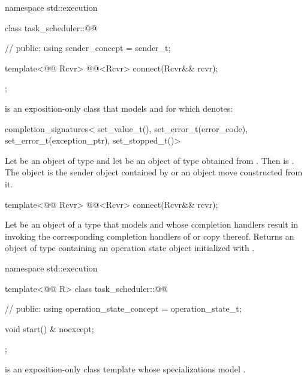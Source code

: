 \pnum
\begin{codeblock}
namespace std::execution {
  class task_scheduler::@@ {     // \expos
  public:
    using sender_concept = sender_t;

    template<@@ Rcvr>
      @@<Rcvr> connect(Rcvr&& rcvr);
  };
}
\end{codeblock}
 is an exposition-only class that models
 and for which
 denotes:
\begin{codeblock}
completion_signatures<
  set_value_t(),
  set_error_t(error_code),
  set_error_t(exception_ptr),
  set_stopped_t()>
\end{codeblock}

\pnum
Let  be an object of type 
and let  be an object of type  obtained
from .
Then 
is .
The object  is the sender object contained by
 or an object move constructed from it.

%
\begin{itemdecl}
template<@@ Rcvr>
  @@<Rcvr> connect(Rcvr&& rcvr);
\end{itemdecl}
\begin{itemdescr}
\pnum
\effects
Let  be an object of a type that models 
and whose completion handlers result in invoking the corresponding
completion handlers of  or copy thereof.
Returns an object of type  containing
an operation state object initialized with .
\end{itemdescr}

\pnum
\begin{codeblock}
namespace std::execution {
  template<@@ R>
  class task_scheduler::@@ {         // \expos
  public:
    using operation_state_concept = operation_state_t;

    void start() & noexcept;
  };
}
\end{codeblock}
 is an exposition-only class template whose
specializations model .

